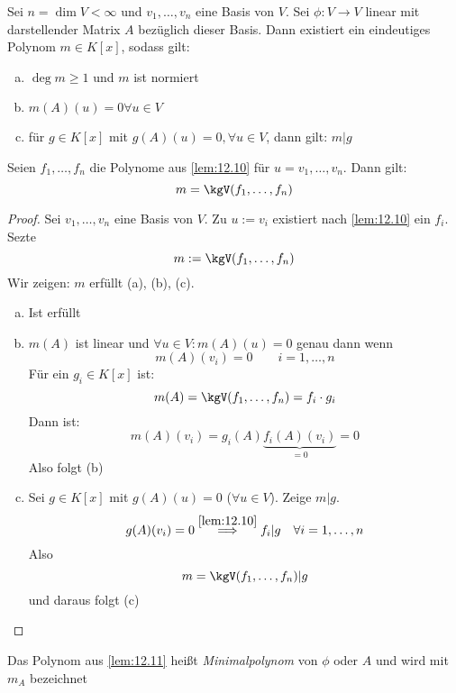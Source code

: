 \documentclass[a4paper, 10pt]{scrbook}
\begin{document}
\begin{lem}[Minimalpolynom]
	\label{lem:12.11}
	Sei $n=\dim V <\infty$ und $v_1,\dotsc,v_n$ eine Basis von $V$.
	Sei $\phi:V\to V$ linear mit darstellender Matrix $A$ bezüglich dieser Basis.
	Dann existiert ein eindeutiges Polynom $m\in K[x]$, sodass gilt:
	\begin{enumerate}[(a)]
		\item
			$\deg m\ge 1$ und $m$ ist normiert
		\item
			$\displaystyle {m(A)(u)=0} \forall u\in V$
		\item
			für $g\in K[x]$ mit $g(A)(u)=0, \forall u\in V$, dann gilt: $m|g$
	\end{enumerate}
	
	Seien $f_1,\dotsc, f_n$ die Polynome aus \ref{lem:12.10} für $u=v_1,\dotsc, v_n$.
	Dann gilt:
	\[
		m=\kgV(f_1,\dotsc, f_n)
	\]
	\begin{proof}
		Sei $v_1,\dotsc,v_n$ eine Basis von $V$.
		Zu $u:=v_i$ existiert nach \ref{lem:12.10} ein $f_i$.
		Sezte
		\[
			m:= \kgV(f_1,\dotsc,f_n)
		\]
		Wir zeigen: $m$ erfüllt (a), (b), (c).
		\begin{enumerate}[(a)]
			\item
				Ist erfüllt
			\item
				$m(A)$ ist linear und $\forall u\in V: m(A)(u)=0$ genau dann wenn
				\[
					m(A)(v_i) = 0 \qquad i=1,\dotsc,n
				\]
				Für ein $g_i\in K[x]$ ist:
				\[
					m(A) = \kgV(f_1,\dotsc,f_n) = f_i \cdot g_i
				\]
				Dann ist:
				\[
					m(A)(v_i) = g_i(A)\underbrace{f_i(A)(v_i)}_{=0} = 0
				\]
				Also folgt (b)
			\item
				Sei $g\in K[x]$ mit $g(A)(u)=0$ ($\forall u\in V$).
				Zeige $m|g$.
				\[
					g(A)(v_i) = 0  \stackrel{\ref{lem:12.10}}\implies f_i|g \quad\forall i=1,\dotsc,n
				\]
				Also
				\[
					m=\kgV(f_1,\dotsc,f_n) |g
				\]
				und daraus folgt (c)
		\end{enumerate}
	\end{proof}
\end{lem}

\begin{df}
	\label{df:12.12}
	Das Polynom aus \ref{lem:12.11} heißt \emph{Minimalpolynom} von $\phi$ oder $A$ und wird mit
	$
		m_A
	$
	bezeichnet
\end{df}
\end{document}
